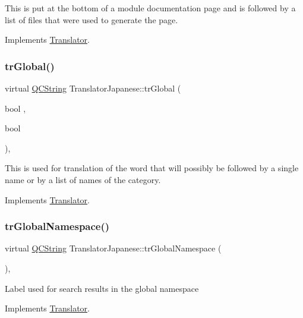 This is put at the bottom of a module documentation page and is followed by a list of files that were used to generate the page. 

Implements \mbox{\hyperlink{class_translator}{Translator}}.

\mbox{\label{class_translator_japanese_af77cef2f7175f04e29588d2eedb4accd}} 
\subsubsection{\texorpdfstring{trGlobal()}{trGlobal()}}
{\footnotesize\ttfamily virtual \mbox{\hyperlink{class_q_c_string}{Q\+C\+String}} Translator\+Japanese\+::tr\+Global (\begin{DoxyParamCaption}\item[{bool}]{,  }\item[{bool}]{ }\end{DoxyParamCaption})\hspace{0.3cm}{\ttfamily [inline]}, {\ttfamily [virtual]}}

This is used for translation of the word that will possibly be followed by a single name or by a list of names of the category. 

Implements \mbox{\hyperlink{class_translator}{Translator}}.

\mbox{\label{class_translator_japanese_a5dc83a5a2f62b37815e590c651c7805c}} 
\subsubsection{\texorpdfstring{trGlobalNamespace()}{trGlobalNamespace()}}
{\footnotesize\ttfamily virtual \mbox{\hyperlink{class_q_c_string}{Q\+C\+String}} Translator\+Japanese\+::tr\+Global\+Namespace (\begin{DoxyParamCaption}{ }\end{DoxyParamCaption})\hspace{0.3cm}{\ttfamily [inline]}, {\ttfamily [virtual]}}

Label used for search results in the global namespace 

Implements \mbox{\hyperlink{class_translator}{Translator}}.

